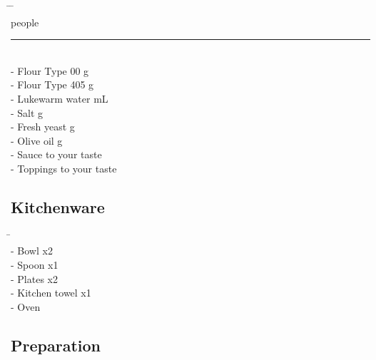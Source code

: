 \documentclass[
  10pt,
  a5paper,
  onecolumn,
  twoside]{article}
\begin{document}
\vspace{-0.5cm}
\begin{tabbing}
\hspace{2ex} \= \hspace{20ex} \= \hspace{4ex} \= \\
\>                   people                \\
\>                  \> \rule{8ex}{0.5pt}         \\
\> - Flour Type 00   \> g                  \\
\> - Flour Type 405  \> g                  \\
\> - Lukewarm water  \> mL                 \\
\> - Salt             \> g                  \\
\> - Fresh yeast       \> g                  \\
\> - Olive oil        \> g                  \\
\> - Sauce          \> to your taste             \\
\> - Toppings       \> to your taste             \\
\end{tabbing}
\vspace{-0.5cm}

\hypertarget{kitchenware}{%
\subsection{Kitchenware}\label{kitchenware}}

\vspace{-0.5cm}
\begin{tabbing}
\hspace{2ex} \= \hspace{19ex} \= \\
\> - Bowl          \> x2         \\
\> - Spoon         \> x1         \\
\> - Plates        \> x2         \\
\> - Kitchen towel \> x1         \\
\> - Oven                        \\
\end{tabbing}
\vspace{-0.5cm}

\hypertarget{preparation}{%
\subsection{Preparation}\label{preparation}}
\end{document}
